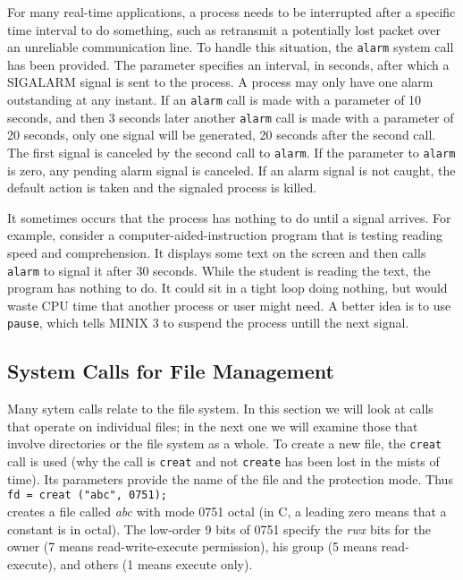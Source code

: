 \documentclass{book}
\newcommand {\sys} [1] {\textsl{#1}}
\newcommand {\cmd} [1] {\texttt{#1}}
\begin{document}
For many real-time applications, a process needs to be interrupted after a specific time interval to do something, 
such as retransmit a potentially lost packet over an unreliable communication line.
To handle this situation, the \cmd{alarm} system call has been provided.
The parameter specifies an interval, in seconds, after which a SIGALARM signal is sent to the process.
A process may only have one alarm outstanding at any instant.
If an \cmd{alarm} call is made with a parameter of 10 seconds, 
and then 3 seconds later another \cmd{alarm} call is made with a parameter of 20 seconds,
only one signal will be generated, 20 seconds after the second call.
The first signal is canceled by the second call to \cmd{alarm}.
If the parameter to \cmd{alarm} is zero, any pending alarm signal is canceled.
If an alarm signal is not caught, the default action is taken and the signaled process is killed.

It sometimes occurs that the process has nothing to do until a signal arrives.
For example, consider a computer-aided-instruction program that is testing reading speed and comprehension.
It displays some text on the screen and then calls \cmd{alarm} to signal it after 30 seconds.
While the student is reading the text, the program has nothing to do.
It could sit in a tight loop doing nothing, but would waste CPU time that another process or user might need.
A better idea is to use \cmd{pause}, which tells MINIX 3 to suspend the process untill the next signal.

\subsection{System Calls for File Management}
Many sytem calls relate to the file system.
In this section we will look at calls that operate on individual files; 
in the next one we will examine those that involve directories or the file system as a whole.
To create a new file, the \cmd{creat} call is used (why the call is \cmd{creat} and not \cmd{create} has been lost in the mists of time).
Its parameters provide the name of the file and the protection mode.
Thus\\
\cmd{fd = creat ("abc", 0751);}\\
creates a file called \sys{abc} with mode 0751 octal (in C, a leading zero means that a constant is in octal).
The low-order 9 bits of 0751 specify the \sys{rwx} bits for the owner (7 means read-write-execute permission),
his group (5 means read-execute), and others (1 means execute only).
\end{document}
